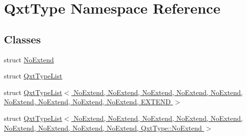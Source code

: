 \hypertarget{namespace_qxt_type}{\section{Qxt\-Type Namespace Reference}
\label{namespace_qxt_type}
}
\subsection*{Classes}
\begin{DoxyCompactItemize}
\item 
struct \hyperlink{struct_qxt_type_1_1_no_extend}{No\-Extend}
\item 
struct \hyperlink{struct_qxt_type_1_1_qxt_type_list}{Qxt\-Type\-List}
\item 
struct \hyperlink{struct_qxt_type_1_1_qxt_type_list_3_01_no_extend_00_01_no_extend_00_01_no_extend_00_01_no_extendaa1bb8779fce2c4754d395885150af9f}{Qxt\-Type\-List$<$ No\-Extend, No\-Extend, No\-Extend, No\-Extend, No\-Extend, No\-Extend, No\-Extend, No\-Extend, No\-Extend, E\-X\-T\-E\-N\-D $>$}
\item 
struct \hyperlink{struct_qxt_type_1_1_qxt_type_list_3_01_no_extend_00_01_no_extend_00_01_no_extend_00_01_no_extenda7fddf7e57fdf60b2427454b96876017}{Qxt\-Type\-List$<$ No\-Extend, No\-Extend, No\-Extend, No\-Extend, No\-Extend, No\-Extend, No\-Extend, No\-Extend, No\-Extend, Qxt\-Type\-::\-No\-Extend $>$}
\end{DoxyCompactItemize}
